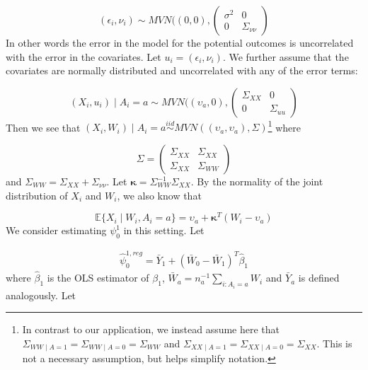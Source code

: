 \begin{equation}\label{eqn:errorcors}
(\epsilon_i, \nu_i) \sim MVN((0, 0), \begin{pmatrix} 
\sigma^2 & 0 \\ 
0 & \Sigma_{\nu\nu}  
\end{pmatrix}
\end{equation}
%
In other words the error in the model for the potential outcomes is uncorrelated with the error in the covariates. Let $u_i = (\epsilon_i, \nu_i)$. We further assume that the covariates are normally distributed and uncorrelated with any of the error terms:

\begin{equation}\label{eqn:xerrorcors}
(X_i, u_i) \mid A_i = a \sim MVN((\upsilon_a, 0), \begin{pmatrix} 
\Sigma_{XX} & 0 \\ 
0 & \Sigma_{uu}  
\end{pmatrix}
\end{equation}
%
Then we see that $(X_i, W_i) \mid A_i = a \stackrel{iid}{\sim} MVN((\upsilon_a, \upsilon_a), \Sigma)$\footnote{In contrast to our application, we instead assume here that $\Sigma_{WW \mid A = 1} = \Sigma_{WW \mid A = 0} = \Sigma_{WW}$ and $\Sigma_{XX \mid A = 1} = \Sigma_{XX \mid A = 0} = \Sigma_{XX}$. This is not a necessary assumption, but helps simplify notation.} where 

\begin{equation}\label{eqn:xwcors}
\Sigma = \begin{pmatrix} 
\Sigma_{XX} & \Sigma_{XX} \\ 
\Sigma_{XX} & \Sigma_{WW}  
\end{pmatrix}
\end{equation}
%
and $\Sigma_{WW} = \Sigma_{XX} + \Sigma_{\nu\nu}$. Let $\mathbf{\kappa} = \Sigma_{WW}^{-1}\Sigma_{XX}$. By the normality of the joint distribution of $X_i$ and $W_i$, we also know that

\begin{equation}
\mathbb{E}\{X_i \mid W_i, A_i = a\} = \upsilon_a + \mathbf{\kappa}^T(W_i - \upsilon_a)
\end{equation}
%
We consider estimating $\psi^1_0$ in this setting. Let 

\begin{align*}
\hat{\psi}^{1, reg}_0 = \bar{Y}_1 + (\bar{W}_0 - \bar{W}_1)^T\hat{\beta}_1
\end{align*}
%
where $\hat{\beta}_1$ is the OLS estimator of $\beta_1$, $\bar{W}_a = n_a^{-1}\sum_{i:A_i = a} W_i$ and $\bar{Y}_a$ is defined analogously. Let 

